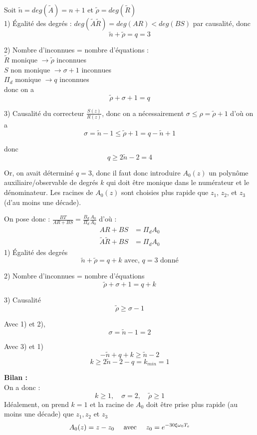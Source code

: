 \documentclass[../main.tex]{subfiles}
\begin{document}
\begin{enumerate}
Soit $\tilde{n} = deg(\tilde{A}) = n+1$ et $\tilde{\rho} = deg(\tilde{R})$\\

1) Égalité des degrés : $deg(\tilde{A}\tilde{R})=deg(AR)<deg(BS)$ par causalité, donc
\[\tilde{n}+\tilde{\rho} = q = 3\]

2) Nombre d'inconnues = nombre d'équations : \\
$\tilde{R}$ monique $\rightarrow \tilde{\rho}$ inconnues\\
$S$ non monique $\rightarrow \sigma +1$ inconnues\\
$\Pi_d$ monique $\rightarrow q$ inconnues\\
donc on a \[\tilde{\rho}+\sigma +1 = q\]

3) Causalité du correcteur $\frac{S(z)}{R(z)}$, donc on a nécessairement $\sigma \leq \rho = \tilde{\rho}+1$
d'où on a
\[ \sigma = \tilde{n} -1 \leq \tilde{\rho} + 1 = q - \tilde{n} +1 \]

donc
\[q \geq 2\tilde{n}-2 = 4\]

Or, on avait déterminé  $q=3$, donc il faut donc introduire $A_0(z)$ un polynôme auxiliaire/observable de degrés $k$ qui doit être monique dans le numérateur et le dénominateur.
Les racines de $A_0(z)$ sont choisies plus rapide que $z_1$, $z_2$, et $z_3$ (d'au moins une décade).


On pose donc : $\frac{BT}{AR+BS} = \frac{B_d}{\Pi_d}\frac{A_0}{A_0}$ d'où :
\begin{align*}
AR+BS & = \Pi_d A_0\\
\tilde{A}\tilde{R} + BS & = \Pi_d A_0
\end{align*}
1) Égalité des degrés
\[\tilde{n} + \tilde{\rho} = q + k \text{ avec, $q=3$ donné}\]

2) Nombre d'inconnues = nombre d'équations
\[ \tilde{\rho} + \sigma +1 = q +k\]

3) Causalité
\[\tilde{\rho} \geq \sigma -1\]

Avec 1) et 2),
\[\sigma = \tilde{n}-1 = 2\]

Avec 3) et 1)
\[-\tilde{n}+q+k \geq \tilde{n}-2\]
\[k \geq 2\tilde{n}-2 -q = k_{min} = 1
\]

\textbf{Bilan :}\\
On a donc :
\[ k \geq 1, \quad \sigma = 2, \quad \tilde{\rho} \geq 1\]
Idéalement, on prend $k=1$ et la racine de $A_0$ doit être prise plus rapide (au moins une décade) que $z_1,z_2$ et $z_3$\\
\[A_0(z) = z-z_0 \quad\text{ avec }\quad z_0 = e^{-30\xi \omega_0 T_e}\]



\end{enumerate}
\end{document}

